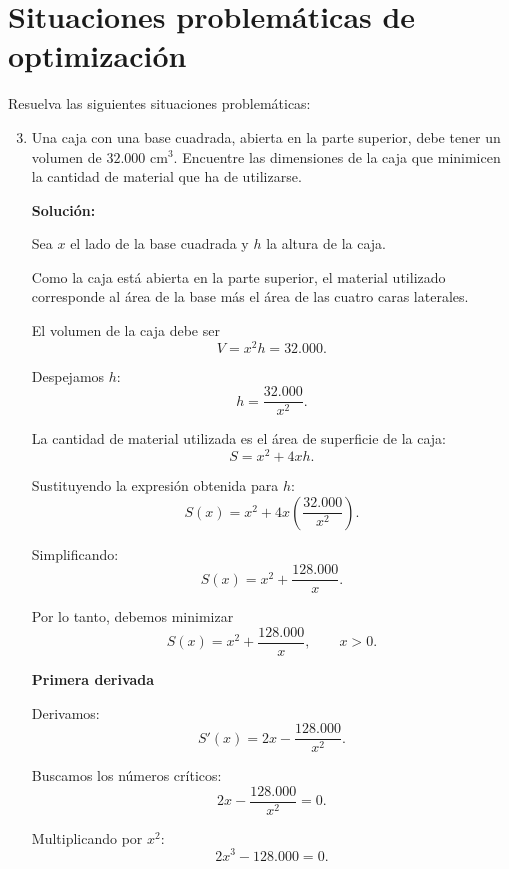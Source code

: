 \documentclass[12pt]{article}
\newcommand{\solucion}{%
    \vspace{0.8em}%
    \textbf{Solución:}%
}
\begin{document}
\section{Situaciones problemáticas de optimización}

Resuelva las siguientes situaciones problemáticas:

\begin{enumerate}[label=\alph*.-]

    \setcounter{enumi}{2} %


    \item Una caja con una base cuadrada, abierta en la parte superior,
    debe tener un volumen de $32.000 \text{ cm}^3$. Encuentre las
    dimensiones de la caja que minimicen la cantidad de material que
    ha de utilizarse.

    \solucion

    Sea $x$ el lado de la base cuadrada y $h$ la altura de la caja.

    Como la caja está abierta en la parte superior, el material utilizado
    corresponde al área de la base más el área de las cuatro caras
    laterales.

    El volumen de la caja debe ser
    \[
    V=x^2h=32.000.
    \]

    Despejamos $h$:
    \[
    h=\frac{32.000}{x^2}.
    \]

    La cantidad de material utilizada es el área de superficie de la
    caja:
    \[
    S=x^2+4xh.
    \]

    Sustituyendo la expresión obtenida para $h$:
    \[
    S(x)
    =
    x^2+4x\left(\frac{32.000}{x^2}\right).
    \]

    Simplificando:
    \[
    S(x)=x^2+\frac{128.000}{x}.
    \]

    Por lo tanto, debemos minimizar
    \[
    \boxed{
    S(x)=x^2+\frac{128.000}{x}
    },
    \qquad x>0.
    \]

    \textbf{Primera derivada}

    Derivamos:
    \[
    S'(x)=2x-\frac{128.000}{x^2}.
    \]

    Buscamos los números críticos:
    \[
    2x-\frac{128.000}{x^2}=0.
    \]

    Multiplicando por $x^2$:
    \[
    2x^3-128.000=0.
    \]


\end{enumerate}
\end{document}
